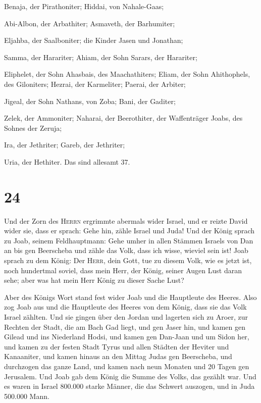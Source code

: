 Benaja, der Pirathoniter; Hiddai, von Nahale-Gaas;

 Abi-Albon, der Arbathiter; Asmaveth, der Barhumiter;

 Eljahba, der Saalboniter; die Kinder Jasen und Jonathan;

 Samma, der Harariter; Ahiam, der Sohn Sarars, der
Harariter;

 Eliphelet, der Sohn Ahasbais, des Maachathiters; Eliam,
der Sohn Ahithophels, des Giloniters;  Hezrai, der
Karmeliter; Paerai, der Arbiter;

 Jigeal, der Sohn Nathans, von Zoba; Bani, der Gaditer;

 Zelek, der Ammoniter; Naharai, der Beerothiter, der
Waffenträger Joabs, des Sohnes der Zeruja;

 Ira, der Jethriter; Gareb, der Jethriter;

 Uria, der Hethiter. Das sind allesamt 37.

\hypertarget{section-23}{%
\section{24}\label{section-23}}

 Und der Zorn des \textsc{Herrn} ergrimmte abermals wider
Israel, und er reizte David wider sie, dass er sprach: Gehe hin, zähle
Israel und Juda!  Und der König sprach zu Joab, seinem
Feldhauptmann: Gehe umher in allen Stämmen Israels von Dan an bis gen
Beerscheba und zähle das Volk, dass ich wisse, wieviel sein ist!
 Joab sprach zu dem König: Der \textsc{Herr}, dein Gott,
tue zu diesem Volk, wie es jetzt ist, noch hundertmal soviel, dass mein
Herr, der König, seiner Augen Lust daran sehe; aber was hat mein Herr
König zu dieser Sache Lust?

 Aber des Königs Wort stand fest wider Joab und die
Hauptleute des Heeres. Also zog Joab aus und die Hauptleute des Heeres
von dem König, dass sie das Volk Israel zählten.  Und sie
gingen über den Jordan und lagerten sich zu Aroer, zur Rechten der
Stadt, die am Bach Gad liegt, und gen Jaser hin,  und
kamen gen Gilead und ins Niederland Hodsi, und kamen gen Dan-Jaan und um
Sidon her,  und kamen zu der festen Stadt Tyrus und allen
Städten der Heviter und Kanaaniter, und kamen hinaus an den Mittag Judas
gen Beerscheba,  und durchzogen das ganze Land, und kamen
nach neun Monaten und 20 Tagen gen Jerusalem.  Und Joab
gab dem König die Summe des Volks, das gezählt war. Und es waren in
Israel 800.000 starke Männer, die das Schwert auszogen, und in Juda
500.000 Mann.

